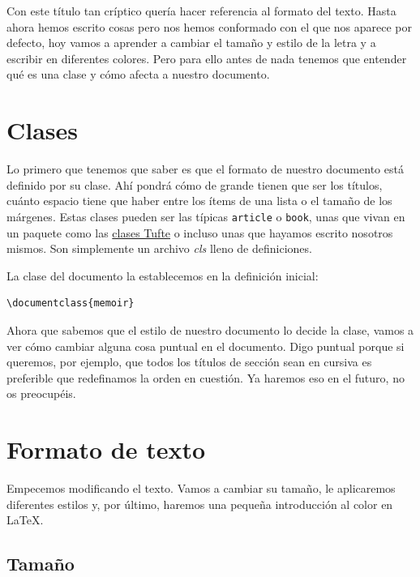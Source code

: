 Con este título tan críptico quería hacer referencia al formato del
texto. Hasta ahora hemos escrito cosas pero nos hemos conformado con el
que nos aparece por defecto, hoy vamos a aprender a cambiar el tamaño y
estilo de la letra y a escribir en diferentes colores. Pero para ello
antes de nada tenemos que entender qué es una clase y cómo afecta a
nuestro documento.

\section{Clases}\label{sec:clases}

Lo primero que tenemos que saber es que el formato de nuestro documento
está definido por su clase. Ahí pondrá cómo de grande tienen que ser los
títulos, cuánto espacio tiene que haber entre los ítems de una lista o
el tamaño de los márgenes. Estas clases pueden ser las típicas
\lstinline!article! o \lstinline!book!, unas que vivan en un paquete
como las \href{http://www.ctan.org/pkg/tufte-latex}{clases Tufte} o
incluso unas que hayamos escrito nosotros mismos. Son simplemente un
archivo \emph{cls} lleno de definiciones.

La clase del documento la establecemos en la definición inicial:

\begin{lstlisting}[language={[latex]tex}]
% Usar la clase memoir
\documentclass{memoir}
\end{lstlisting}

Ahora que sabemos que el estilo de nuestro documento lo decide la clase,
vamos a ver cómo cambiar alguna cosa puntual en el documento. Digo
puntual porque si queremos, por ejemplo, que todos los títulos de
sección sean en cursiva es preferible que redefinamos la orden en
cuestión. Ya haremos eso en el futuro, no os preocupéis.

\section{Formato de texto}\label{sec:formato}

Empecemos modificando el texto. Vamos a cambiar su tamaño, le
aplicaremos diferentes estilos y, por último, haremos una pequeña
introducción al color en LaTeX.

\subsection{Tamaño}\label{sec:tamano}

